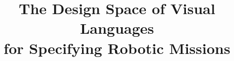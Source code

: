 \documentclass[sigplan,anonymous]{acmart} %
\begin{document}
\title{The Design Space of Visual Languages\\for Specifying Robotic Missions}

\renewcommand{\shorttitle}{Design Space of Visual Languages for Specifying Robotic Missions}

\maketitle


























\end{document}
